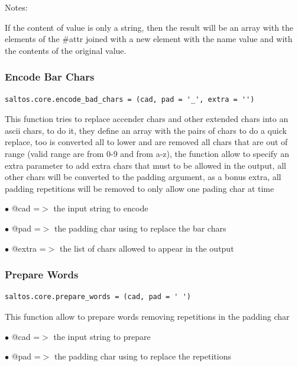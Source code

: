 \documentclass[a4paper]{article}
\begin{document}
Notes:

If the content of value is only a string, then the result will be an array with the
elements of the \#attr joined with a new element with the name value and with the contents
of the original value.

\hypertarget{toc155}{}
\subsubsection{Encode Bar Chars}

\begin{lstlisting}
saltos.core.encode_bad_chars = (cad, pad = '_', extra = '')
\end{lstlisting}

This function tries to replace accender chars and other extended chars into
an ascii chars, to do it, they define an array with the pairs of chars to
do a quick replace, too is converted all to lower and are removed all chars
that are out of range (valid range are from 0-9 and from a-z), the function
allow to specify an extra parameter to add extra chars that must to be
allowed in the output, all other chars will be converted to the padding
argument, as a bonus extra, all padding repetitions will be removed to
only allow one pading char at time

\begin{compactitem}
\item[\color{myblue}$\bullet$] @cad   =$>$ the input string to encode
\item[\color{myblue}$\bullet$] @pad   =$>$ the padding char using to replace the bar chars
\item[\color{myblue}$\bullet$] @extra =$>$ the list of chars allowed to appear in the output
\end{compactitem}

\hypertarget{toc156}{}
\subsubsection{Prepare Words}

\begin{lstlisting}
saltos.core.prepare_words = (cad, pad = ' ')
\end{lstlisting}

This function allow to prepare words removing repetitions in the padding char

\begin{compactitem}
\item[\color{myblue}$\bullet$] @cad =$>$ the input string to prepare
\item[\color{myblue}$\bullet$] @pad =$>$ the padding char using to replace the repetitions
\end{compactitem}
\end{document}

